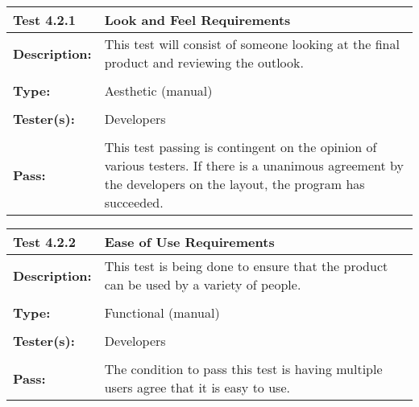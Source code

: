 \documentclass{article}
\begin{document}
\begin{tabularx}{\textwidth}{p{2cm}p{9cm}}
\toprule 
{\bf Test 4.2.1} & {\bf Look and Feel Requirements}\\
\midrule
\textbf{Description:} & This test will consist of someone looking at the final product and reviewing the outlook. \\[0.3\baselineskip]
                      &                     \\
\textbf{Type:} & Aesthetic (manual)   \\[0.3\baselineskip]
                      &                     \\
\textbf{Tester(s):} & Developers \\[0.3\baselineskip]
                      &                     \\
\textbf{Pass:} & This test passing is contingent on the opinion of various testers. If there is a unanimous agreement by the developers on the layout, the program has succeeded. \\[0.3\baselineskip]
\bottomrule
\end{tabularx}

\begin{tabularx}{\textwidth}{p{2cm}p{9cm}}
\toprule 
{\bf Test 4.2.2} & {\bf Ease of Use Requirements}\\
\midrule
\textbf{Description:} & This test is being done to ensure that the product can be used by a variety of people. \\[0.3\baselineskip]
                      &                     \\
\textbf{Type:} & Functional (manual)   \\[0.3\baselineskip]
                      &                     \\
\textbf{Tester(s):} & Developers \\[0.3\baselineskip]
                      &                     \\
\textbf{Pass:} & The condition to pass this test is having multiple users agree that it is easy to use. \\[0.3\baselineskip]
\bottomrule
\end{tabularx}
\end{document}
